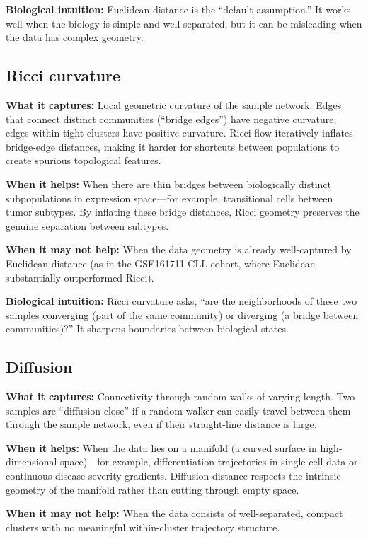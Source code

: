\documentclass[11pt]{article}
\begin{document}
\textbf{Biological intuition:} Euclidean distance is the ``default assumption.''
It works well when the biology is simple and well-separated, but it can be misleading when the data has complex geometry.

\subsection{Ricci curvature}

\textbf{What it captures:} Local geometric curvature of the sample network.
Edges that connect distinct communities (``bridge edges'') have negative curvature; edges within tight clusters have positive curvature.
Ricci flow iteratively inflates bridge-edge distances, making it harder for shortcuts between populations to create spurious topological features.

\textbf{When it helps:} When there are thin bridges between biologically distinct subpopulations in expression space---for example, transitional cells between tumor subtypes.
By inflating these bridge distances, Ricci geometry preserves the genuine separation between subtypes.

\textbf{When it may not help:} When the data geometry is already well-captured by Euclidean distance (as in the GSE161711 CLL cohort, where Euclidean substantially outperformed Ricci).

\textbf{Biological intuition:} Ricci curvature asks, ``are the neighborhoods of these two samples converging (part of the same community) or diverging (a bridge between communities)?''
It sharpens boundaries between biological states.

\subsection{Diffusion}

\textbf{What it captures:} Connectivity through random walks of varying length.
Two samples are ``diffusion-close'' if a random walker can easily travel between them through the sample network, even if their straight-line distance is large.

\textbf{When it helps:} When the data lies on a manifold (a curved surface in high-dimensional space)---for example, differentiation trajectories in single-cell data or continuous disease-severity gradients.
Diffusion distance respects the intrinsic geometry of the manifold rather than cutting through empty space.

\textbf{When it may not help:} When the data consists of well-separated, compact clusters with no meaningful within-cluster trajectory structure.
\end{document}
